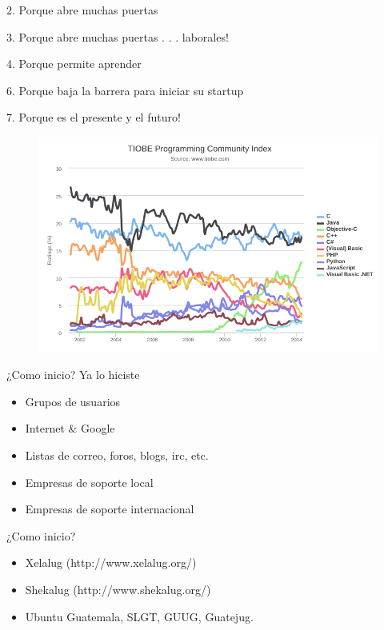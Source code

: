 \documentclass{beamer}
\begin{document}
\begin{frame}{}
2. Porque abre muchas puertas
\end{frame}

\begin{frame}{}
3. Porque abre muchas puertas . . . laborales!
\end{frame}

\begin{frame}{}
4. Porque permite aprender
\end{frame}

\begin{frame}{}
6. Porque baja la barrera para iniciar su startup
\end{frame}

\begin{frame}{}
7. Porque es el presente y el futuro!
    \begin{figure}[tbph]
        \centering
        \includegraphics[width=0.7\linewidth]{Images/tiboe.png}
    \end{figure}
\end{frame}


\begin{frame}{¿Como inicio?}
    Ya lo hiciste
    \pause
    \begin{itemize}
    \item Grupos de usuarios
    \item Internet \& Google
    \item Listas de correo, foros, blogs, irc, etc.
    \item Empresas de soporte local
    \item Empresas de soporte internacional
    \end{itemize}
\end{frame}

\begin{frame}{¿Como inicio?}
\begin{itemize}
\item Xelalug (http://www.xelalug.org/)
\item Shekalug (http://www.shekalug.org/)
\item Ubuntu Guatemala, SLGT, GUUG, Guatejug.
\end{itemize}
\end{frame}
\end{document}

